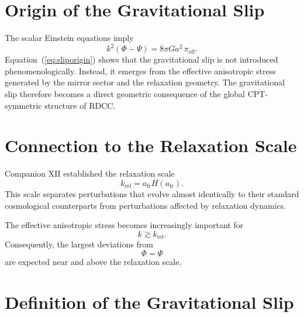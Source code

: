 \documentclass[11pt,a4paper]{article}
\begin{document}
\section{Origin of the Gravitational Slip}

The scalar Einstein equations imply
\begin{equation}
  k^{2}
  \left(
    \Phi - \Psi
  \right)
  =
  8\pi G a^{2}\,
  \pi_{\mathrm{eff}}.
  \label{eq:sliporigin}
\end{equation}
Equation~(\ref{eq:sliporigin}) shows that the gravitational slip is not
introduced phenomenologically. Instead, it emerges from the effective
anisotropic stress generated by the mirror sector and the relaxation geometry.
The gravitational slip therefore becomes a direct geometric consequence of the
global CPT-symmetric structure of RDCC.

\section{Connection to the Relaxation Scale}

Companion XII established the relaxation scale
\begin{equation}
  k_{\mathrm{rel}}
  =
  a_{\mathrm{fr}} H(a_{\mathrm{fr}}).
\end{equation}
This scale separates perturbations that evolve almost identically to their
standard cosmological counterparts from perturbations affected by relaxation
dynamics.

The effective anisotropic stress becomes increasingly important for
\begin{equation}
  k \gtrsim k_{\mathrm{rel}}.
\end{equation}
Consequently, the largest deviations from
\begin{equation}
  \Phi = \Psi
\end{equation}
are expected near and above the relaxation scale.

\section{Definition of the Gravitational Slip}
\end{document}
